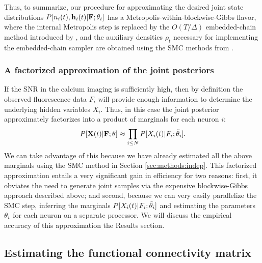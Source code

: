 Thus, to summarize, our procedure for approximating the desired joint state distributions $P[n_i(t), \mathbf{h}_i(t) | {\bf F};\mathbf{\theta}_i]$ has a Metropolis-within-blockwise-Gibbs flavor, where the internal Metropolis step is replaced by the $O(T/\Delta)$ embedded-chain method introduced by \cite{NBR03}, and the auxiliary densities $\rho_t$ necessary for implementing the embedded-chain sampler are obtained using the SMC methods from \cite{Vogelstein2009}.

\subsubsection{A factorized approximation of the joint posteriors}
\label{sec:cheaper-high-snr}

If the SNR in the calcium imaging is sufficiently high, then by definition the observed fluorescence data $F_i$ will provide enough information to determine the underlying hidden variables $X_i$. Thus, in this case the joint posterior approximately factorizes into a product of marginals for each neuron $i$:
\begin{equation} \label{eqn:indep_approx}
  P[\bX(t)|\bF;\bth] \approx \prod_{i\leq N} P[X_i(t)|F_i;\tbth_i].
\end{equation}
We can take advantage of this because we have already estimated all the above marginals using the SMC method in Section \ref{sec:methods:indep}. %
This factorized approximation entails a very significant gain in efficiency for two reasons: first, it obviates the need to generate joint samples via the expensive blockwise-Gibbs approach described above; and second, because we can very easily parallelize the SMC step, inferring the marginals $P[X_i(t) | F_i; \tilde{\mathbf{\theta}}_i]$ and estimating the parameters $\mathbf{\theta}_i$ for each neuron on a separate processor. We will discuss the empirical accuracy of this approximation the Results section.

\subsection{Estimating the functional connectivity matrix} \label{sec:methods:parameters HMM}

